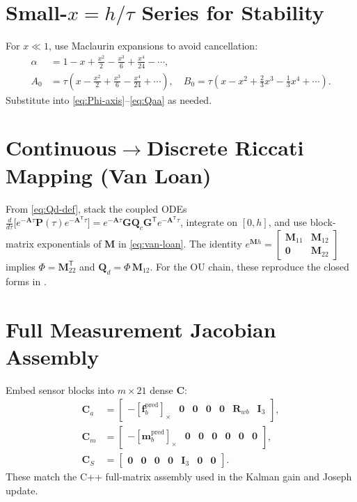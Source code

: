 \documentclass[11pt]{article}
\newcommand{\vect}[1]{\bm{#1}}
\newcommand{\mat}[1]{\bm{#1}}
\newcommand{\T}{\mathsf{T}}
\newcommand{\I}{\mat{I}}
\newcommand{\skew}[1]{\left[ #1 \right]_\times}
\begin{document}
\section{Small-\texorpdfstring{$x=h/\tau$}{x} Series for Stability}
\label{app:series-guards}
For \(x\ll 1\), use Maclaurin expansions to avoid cancellation:
\begin{align}
  \alpha &= 1 - x + \tfrac{x^2}{2} - \tfrac{x^3}{6} + \tfrac{x^4}{24} - \cdots, \\
  A_0 &= \tau\!\left(x - \tfrac{x^2}{2} + \tfrac{x^3}{6} - \tfrac{x^4}{24} + \cdots\right),\quad
  B_0 = \tau\!\left(x - x^2 + \tfrac{2}{3}x^3 - \tfrac{1}{3}x^4 + \cdots\right).
  \label{eq:series}
\end{align}
Substitute into \eqref{eq:Phi-axis}--\eqref{eq:Qaa} as needed.

\section{Continuous\texorpdfstring{$\to$}{}Discrete Riccati Mapping (Van Loan)}
\label{app:van-loan-derivation}
From \eqref{eq:Qd-def}, stack the coupled ODEs
\(
\frac{d}{d\tau}\bigl[e^{-\mat{A}\tau}\mat{P}(\tau)e^{-\mat{A}^{\T}\tau}\bigr]
= e^{-\mat{A}\tau}\mat{G}\mat{Q}_c\mat{G}^{\T} e^{-\mat{A}^{\T}\tau}
\),
integrate on \([0,h]\), and use block-matrix exponentials of \(\mat{M}\) in \eqref{eq:van-loan}.
The identity \(e^{\mat{M}h}=\begin{bmatrix}\mat{M}_{11}&\mat{M}_{12}\\\mat{0}&\mat{M}_{22}\end{bmatrix}\)
implies \(\Phi=\mat{M}_{22}^{\T}\) and \(\mat{Q}_d=\Phi\,\mat{M}_{12}\).
For the OU chain, these reproduce the closed forms in .

\section{Full Measurement Jacobian Assembly}
\label{app:full-C}
Embed sensor blocks into \(m\times 21\) dense \(\mat{C}\):
\begin{align}
  \mat{C}_a &= \begin{bmatrix}
     -\skew{\vect{f}_b^{\mathrm{pred}}} & \mat{0} & \mat{0} & \mat{0} & \mat{0} & \mat{R}_{wb} & \I_3
  \end{bmatrix}, \label{eq:C-acc-full}\\
  \mat{C}_m &= \begin{bmatrix}
     -\skew{\vect{m}_b^{\mathrm{pred}}} & \mat{0} & \mat{0} & \mat{0} & \mat{0} & \mat{0} & \mat{0}
  \end{bmatrix}, \label{eq:C-mag-full}\\
  \mat{C}_S &= \begin{bmatrix}
     \mat{0} & \mat{0} & \mat{0} & \mat{0} & \I_3 & \mat{0} & \mat{0}
  \end{bmatrix}. \label{eq:C-S-full}
\end{align}
These match the C++ full-matrix assembly used in the Kalman gain and Joseph update.
\end{document}

